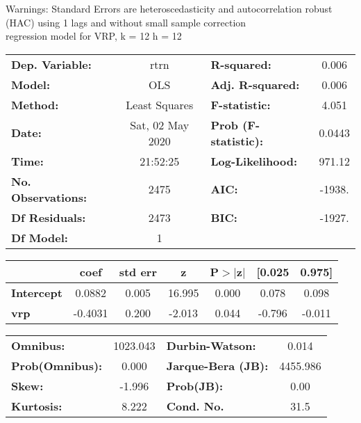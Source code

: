 Warnings: \newline
 [1] Standard Errors are heteroscedasticity and autocorrelation robust (HAC) using 1 lags and without small sample correction\\ 

regression model for VRP, k = 12 h = 12\begin{center}
\begin{tabular}{lclc}
\toprule
\textbf{Dep. Variable:}    &       rtrn       & \textbf{  R-squared:         } &     0.006   \\
\textbf{Model:}            &       OLS        & \textbf{  Adj. R-squared:    } &     0.006   \\
\textbf{Method:}           &  Least Squares   & \textbf{  F-statistic:       } &     4.051   \\
\textbf{Date:}             & Sat, 02 May 2020 & \textbf{  Prob (F-statistic):} &   0.0443    \\
\textbf{Time:}             &     21:52:25     & \textbf{  Log-Likelihood:    } &    971.12   \\
\textbf{No. Observations:} &        2475      & \textbf{  AIC:               } &    -1938.   \\
\textbf{Df Residuals:}     &        2473      & \textbf{  BIC:               } &    -1927.   \\
\textbf{Df Model:}         &           1      & \textbf{                     } &             \\
\bottomrule
\end{tabular}
\begin{tabular}{lcccccc}
                   & \textbf{coef} & \textbf{std err} & \textbf{z} & \textbf{P$> |$z$|$} & \textbf{[0.025} & \textbf{0.975]}  \\
\midrule
\textbf{Intercept} &       0.0882  &        0.005     &    16.995  &         0.000        &        0.078    &        0.098     \\
\textbf{vrp}       &      -0.4031  &        0.200     &    -2.013  &         0.044        &       -0.796    &       -0.011     \\
\bottomrule
\end{tabular}
\begin{tabular}{lclc}
\textbf{Omnibus:}       & 1023.043 & \textbf{  Durbin-Watson:     } &    0.014  \\
\textbf{Prob(Omnibus):} &   0.000  & \textbf{  Jarque-Bera (JB):  } & 4455.986  \\
\textbf{Skew:}          &  -1.996  & \textbf{  Prob(JB):          } &     0.00  \\
\textbf{Kurtosis:}      &   8.222  & \textbf{  Cond. No.          } &     31.5  \\
\bottomrule
\end{tabular}
\end{center}

